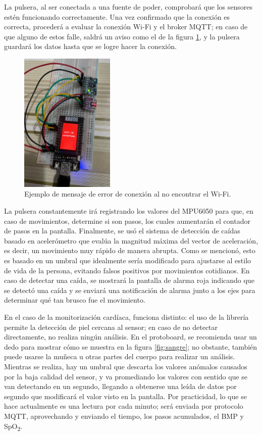 \documentclass[12pt, a4paper]{article}
\begin{document}
	La pulsera, al ser conectada a una fuente de poder, comprobará que los sensores estén funcionando correctamente. Una vez confirmado que la conexión es correcta, procederá a evaluar la conexión Wi-Fi y el broker MQTT; en caso de que alguno de estos falle, saldrá un aviso como el de la figura \ref{fig:error}, y la pulsera guardará los datos hasta que se logre hacer la conexión.
		
	\begin{figure}[htbp]
		\centering
		\includegraphics[width=0.4\textwidth]{images/error_wifi.jpg}
		\caption[Ejemplo]{Ejemplo de mensaje de error de conexión al no encontrar el Wi-Fi.}
		\label{fig:error}
	\end{figure}
	
	
	La pulsera constantemente irá registrando los valores del MPU6050 para que, en caso de movimientos, determine si son pasos, los cuales aumentarán el contador de pasos en la pantalla. Finalmente, se usó el sistema de detección de caídas basado en acelerómetro que evalúa la magnitud máxima del vector de aceleración, es decir, un movimiento muy rápido de manera abrupta. Como se mencionó, esto es basado en un umbral que idealmente sería modificado para ajustarse al estilo de vida de la persona, evitando falsos positivos por movimientos cotidianos. En caso de detectar una caída, se mostrará la pantalla de alarma roja indicando que se detectó una caída y se enviará una notificación de alarma junto a los ejes para determinar qué tan brusco fue el movimiento.
	
	En el caso de la monitorización cardíaca, funciona distinto: el uso de la librería permite la detección de piel cercana al sensor; en caso de no detectar directamente, no realiza ningún análisis. En el protoboard, se recomienda usar un dedo para mostrar cómo se muestra en la figura \ref{fig:sangre}; no obstante, también puede usarse la muñeca u otras partes del cuerpo para realizar un análisis. Mientras se realiza, hay un umbral que descarta los valores anómalos causados por la baja calidad del sensor, y va promediando los valores con sentido que se van detectando en un segundo, llegando a obtenerse una leída de datos por segundo que modificará el valor visto en la pantalla. Por practicidad, lo que se hace actualmente es una lectura por cada minuto; será enviada por protocolo MQTT, aprovechando y enviando el tiempo, los pasos acumulados, el BMP y SpO\textsubscript{2}.
	
\end{document}
